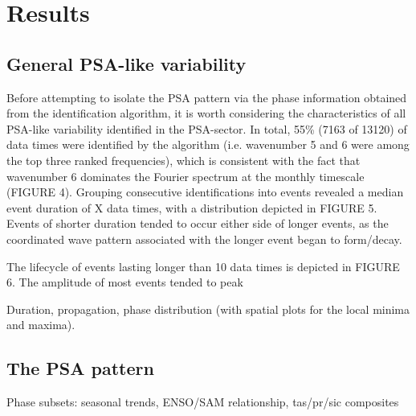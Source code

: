 \section{Results}

\subsection{General PSA-like variability}

Before attempting to isolate the PSA pattern via the phase information obtained from the identification algorithm, it is worth considering the characteristics of all PSA-like variability identified in the PSA-sector. In total, 55\% (7163 of 13120) of data times were identified by the algorithm (i.e. wavenumber 5 and 6 were among the top three ranked frequencies), which is consistent with the fact that wavenumber 6 dominates the Fourier spectrum at the monthly timescale (FIGURE 4). Grouping consecutive identifications into events revealed a median event duration of X data times, with a distribution depicted in FIGURE 5. Events of shorter duration tended to occur either side of longer events, as the coordinated wave pattern associated with the longer event began to form/decay.

The lifecycle of events lasting longer than 10 data times is depicted in FIGURE 6. The amplitude of most events tended to peak

Duration, propagation, phase distribution (with spatial plots for the local minima and maxima).

\subsection{The PSA pattern}

Phase subsets: seasonal trends, ENSO/SAM relationship, tas/pr/sic composites







